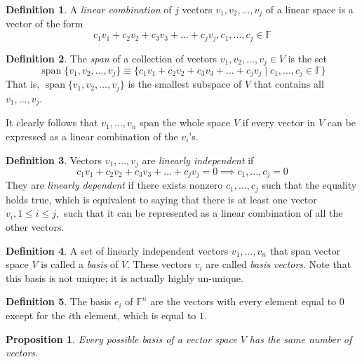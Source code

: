 \documentclass{article}
\DeclareMathOperator{\Span}{span}
\newtheorem{proposition}[theorem]{Proposition}
\theoremstyle{remark}
\theoremstyle{definition}
\newtheorem{definition}{Definition}[section]
\begin{document}
    \begin{definition}
    A \textit{linear combination} of $j$ vectors $v_1, v_2, ..., v_j$ of a linear space is a vector of the form 
    \begin{equation}
        c_1 v_1 + c_2 v_2 + c_3 v_3 + ... + c_j v_j, c_1, ..., c_j \in \mathbb{F}
    \end{equation}
    \end{definition}

    \begin{definition}
    The \textit{span} of a collection of vectors $v_1, v_2, ..., v_j \in V$ is the set
    \[\Span \{ v_1, v_2, ..., v_j \} \equiv \{ c_1 v_1 + c_2 v_2 + c_3 v_3 + ... + c_j v_j\; | \; c_1, ..., c_j \in \mathbb{F}\} \]
    That is, $\Span \{v_1, v_2, ..., v_j\}$ is the smallest subspace of $V$ that contains all $v_1, ..., v_j$. 
    \end{definition}

    It clearly follows that $v_1, ..., v_n$ span the whole space $V$ if every vector in $V$ can be expressed as a linear combination of the $v_i$'s. 

    \begin{definition}
    Vectors $v_1, ..., v_j$ are \textit{linearly independent} if 
    \[ c_1 v_1 + c_2 v_2 + c_3 v_3 + ... + c_j v_j = 0 \implies c_1, ..., c_j = 0\]
    They are \textit{linearly dependent} if there exists nonzero $c_1, ..., c_j$ such that the equality holds true, which is equivalent to saying that there is at least one vector $v_i, 1 \leq i \leq j,$ such that it can be represented as a linear combination of all the other vectors. 
    \end{definition}

    \begin{definition}
    A set of linearly independent vectors $v_1, ..., v_n$ that span vector space $V$ is called a \textit{basis} of $V$. These vectors $v_i$ are called \textit{basis vectors}. Note that this basis is not unique; it is actually highly un-unique. 
    \end{definition}

    \begin{definition}
    The basis $e_i$ of $\mathbb{F}^n$ are the vectors with every element equal to $0$ except for the $i$th element, which is equal to $1$. 
    \end{definition}

    \begin{proposition}
    Every possible basis of a vector space $V$ has the same number of vectors.
    \end{proposition}
\end{document}
